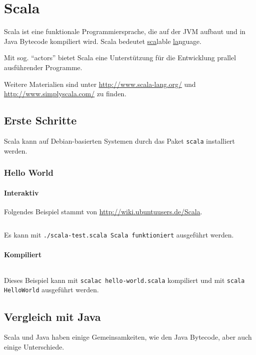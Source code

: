 \chapter{Scala}

Scala ist eine funktionale Programmiersprache, die auf der JVM aufbaut
und in Java Bytecode kompiliert wird. Scala bedeutet \underline{sca}lable
\underline{la}nguage.

Mit sog. \enquote{actors} bietet Scala eine Unterstützung für die Entwicklung
prallel ausführender Programme.

Weitere Materialien sind unter \url{http://www.scala-lang.org/} und
\url{http://www.simplyscala.com/} zu finden.

\section{Erste Schritte}
Scala kann auf Debian-basierten Systemen durch das Paket \texttt{scala} installiert
werden.

\subsection{Hello World}
\subsubsection{Interaktiv}
Folgendes Beispiel stammt von \url{http://wiki.ubuntuusers.de/Scala}.
\inputminted[linenos, numbersep=5pt, tabsize=4, frame=lines, label=scala-test.scala]{scala}{scripts/scala/scala-test.scala}
Es kann mit \texttt{./scala-test.scala Scala funktioniert} ausgeführt werden.

\subsubsection{Kompiliert}
\inputminted[linenos, numbersep=5pt, tabsize=4, frame=lines, label=hello-world.scala]{scala}{scripts/scala/hello-world.scala}

Dieses Beispiel kann mit \texttt{scalac hello-world.scala} kompiliert und mit
\texttt{scala HelloWorld} ausgeführt werden.

\section{Vergleich mit Java}
Scala und Java haben einige Gemeinsamkeiten, wie den Java Bytecode, aber auch
einige Unterschiede.

